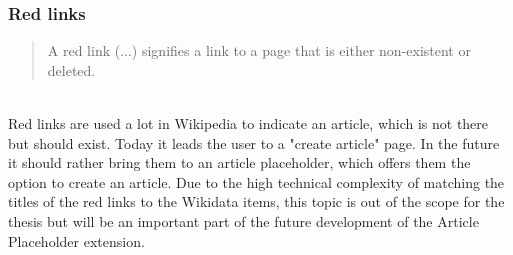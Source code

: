 \subsubsection{Red links}
\begin{quotation}
A red link (...) signifies a link to a page that is either non-existent or deleted. 
\end{quotation} \cite{wiki:01} %
\\
Red links are used a lot in Wikipedia to indicate an article, which is not there but should exist. Today it leads the user to a "create article" page. In the future it should rather bring them to an article placeholder, which offers them the option to create an article. Due to the high technical complexity of matching the titles of the red links to the Wikidata items, this topic is out of the scope for the thesis but will be an important part of the future development of the Article Placeholder extension. 

